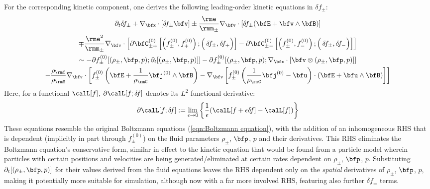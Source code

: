     For the corresponding kinetic component, one derives the following leading-order kinetic equations in $\delta\! f_{\pm}$:
    \begin{multline}
        \partial_{t}\delta\! f_{\pm} + \nabla_{\bfx}\cdot[\delta\! f_{\pm}\bfv] \pm \frac{\rme}{\rmm_{\pm}}\nabla_{\bfv}\cdot[\delta\! f_{\pm}(\bfE + \bfv\wedge\bfB)]  \\
        \mp \frac{\rme^{2}}{\rmm_{\pm}}\nabla_{\bfv}\cdot\left[\partial\bfC_{\pm+}^{(0)}\left[\left(f_{\pm}^{(0)}, f_{+}^{(0)}\right); \left({\color{white} f_{+}^{(0)}}\!\!\!\!\!\!\!\!\!\delta\! f_{\pm}, \delta\! f_{+}\right)\right] - \partial\bfC_{\pm-}^{(0)}\left[\left(f_{\pm}^{(0)}, f_{-}^{(0)}\right); \left({\color{white} f_{+}^{(0)}}\!\!\!\!\!\!\!\!\!\delta\! f_{\pm}, \delta\! f_{-}\right)\right]\right]  \\
        \sim  - \partial f_{\pm}^{(0)}[(\rho_{\pm}, \bfp, p); \partial_{t}[(\rho_{\pm}, \bfp, p)]] - \partial f_{\pm}^{(0)}[(\rho_{\pm}, \bfp, p); \nabla_{\bfx}\cdot[\bfv\otimes(\rho_{\pm}, \bfp, p)]]  \\
        - \frac{\rho_{\rmC}}{\rho_{\rmM}}\nabla_{\bfv}\cdot\left[f_{\pm}^{(0)}\left(\bfE + \frac{1}{\rho_{\rmC}}\bfj^{(0)}\wedge\bfB\right) - \nabla_{\bfv}\left[f_{\pm}^{(0)}\left(\frac{1}{\rho_{\rmC}}\bfj^{(0)} - \bfu\right)\cdot\left(\bfE + \bfu\wedge\bfB\right)\right]\right]
    \end{multline}
    Here, for a functional $\calL[f]$, $\partial\calL[f; \delta\! f]$ denotes its $L^{2}$ functional derivative:
    \begin{equation}
        \partial\calL[f; \delta\! f]  :=  \lim_{\epsilon \rightarrow 0}\left\{\frac{1}{\epsilon}(\calL[f + \epsilon\delta\! f] - \calL[f])\right\}
    \end{equation}
    These equations resemble the original Boltzmann equations (\ref{eqn:Boltzmann equation}), with the addition of an inhomogeneous RHS that is dependent (implicitly in part through $f_{\pm}^{(0)}$) on the fluid parameters $\rho_{\pm}$, $\bfp$, $p$ and their derivatives. This RHS eliminates the Boltzmann equation's conservative form, similar in effect to the kinetic equation that would be found from a particle model wherein particles with certain positions and velocities are being generated/eliminated at certain rates dependent on $\rho_{\pm}$, $\bfp$, $p$. Substituting $\partial_{t}[(\rho_{\pm}, \bfp, p)]$ for their values derived from the fluid equations leaves the RHS dependent only on the \emph{spatial} derivatives of $\rho_{\pm}$, $\bfp$, $p$, making it potentially more suitable for simulation, although now with a far more involved RHS, featuring also further $\delta\! f_{\pm}$ terms.

